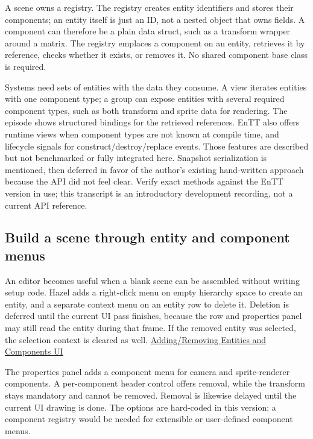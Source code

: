 A scene owns a registry. The registry creates entity identifiers and stores their components; an entity itself is just an ID, not a nested object that owns fields. A component can therefore be a plain data struct, such as a transform wrapper around a matrix. The registry emplaces a component on an entity, retrieves it by reference, checks whether it exists, or removes it. No shared component base class is required.

Systems need sets of entities with the data they consume. A view iterates entities with one component type; a group can expose entities with several required component types, such as both transform and sprite data for rendering. The episode shows structured bindings for the retrieved references. EnTT also offers runtime views when component types are not known at compile time, and lifecycle signals for construct/destroy/replace events. Those features are described but not benchmarked or fully integrated here. Snapshot serialization is mentioned, then deferred in favor of the author's existing hand-written approach because the API did not feel clear. Verify exact methods against the EnTT version in use; this transcript is an introductory development recording, not a current API reference.

\subsection{Build a scene through entity and component menus}\label{06-engine-ii-ch031-build-a-scene-through-entity-and-component-menus}

An editor becomes useful when a blank scene can be assembled without writing setup code. Hazel adds a right-click menu on empty hierarchy space to create an entity, and a separate context menu on an entity row to delete it. Deletion is deferred until the current UI pass finishes, because the row and properties panel may still read the entity during that frame. If the removed entity was selected, the selection context is cleared as well. \href{https://www.youtube.com/watch?v=PsyGmsIgp9M}{Adding/Removing Entities and Components UI}

The properties panel adds a component menu for camera and sprite-renderer components. A per-component header control offers removal, while the transform stays mandatory and cannot be removed. Removal is likewise delayed until the current UI drawing is done. The options are hard-coded in this version; a component registry would be needed for extensible or user-defined component menus.


